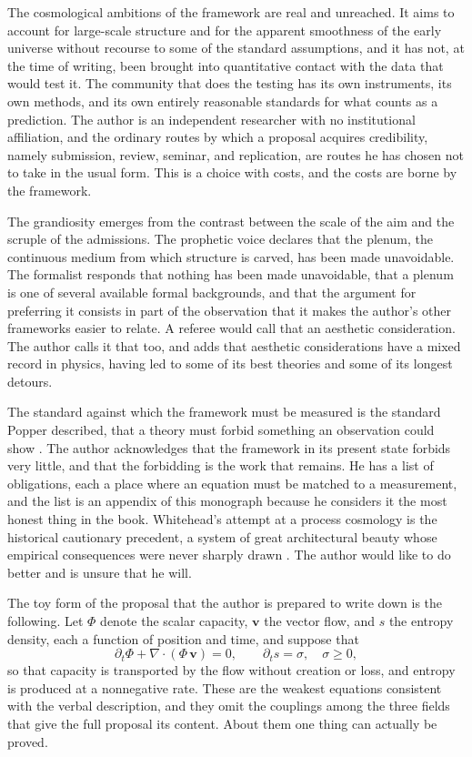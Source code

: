\documentclass[11pt,openany,twoside]{book}
\theoremstyle{plain}
\theoremstyle{definition}
\theoremstyle{remark}
\begin{document}
The cosmological ambitions of the framework are real and unreached. It aims to account for large-scale structure and for the apparent smoothness of the early universe without recourse to some of the standard assumptions, and it has not, at the time of writing, been brought into quantitative contact with the data that would test it. The community that does the testing has its own instruments, its own methods, and its own entirely reasonable standards for what counts as a prediction. The author is an independent researcher with no institutional affiliation, and the ordinary routes by which a proposal acquires credibility, namely submission, review, seminar, and replication, are routes he has chosen not to take in the usual form. This is a choice with costs, and the costs are borne by the framework.

The grandiosity emerges from the contrast between the scale of the aim and the scruple of the admissions. The prophetic voice declares that the plenum, the continuous medium from which structure is carved, has been made unavoidable. The formalist responds that nothing has been made unavoidable, that a plenum is one of several available formal backgrounds, and that the argument for preferring it consists in part of the observation that it makes the author's other frameworks easier to relate. A referee would call that an aesthetic consideration. The author calls it that too, and adds that aesthetic considerations have a mixed record in physics, having led to some of its best theories and some of its longest detours.

The standard against which the framework must be measured is the standard Popper described, that a theory must forbid something an observation could show \cite{popper-logic}. The author acknowledges that the framework in its present state forbids very little, and that the forbidding is the work that remains. He has a list of obligations, each a place where an equation must be matched to a measurement, and the list is an appendix of this monograph because he considers it the most honest thing in the book. Whitehead's attempt at a process cosmology is the historical cautionary precedent, a system of great architectural beauty whose empirical consequences were never sharply drawn \cite{whitehead-process}. The author would like to do better and is unsure that he will.

The toy form of the proposal that the author is prepared to write down is the following. Let $\Phi$ denote the scalar capacity, $\mathbf v$ the vector flow, and $s$ the entropy density, each a function of position and time, and suppose that
\[
\partial_t \Phi + \nabla\!\cdot(\Phi\,\mathbf v) = 0,
\qquad
\partial_t s = \sigma,\quad \sigma \ge 0,
\]
so that capacity is transported by the flow without creation or loss, and entropy is produced at a nonnegative rate. These are the weakest equations consistent with the verbal description, and they omit the couplings among the three fields that give the full proposal its content. About them one thing can actually be proved.
\end{document}
